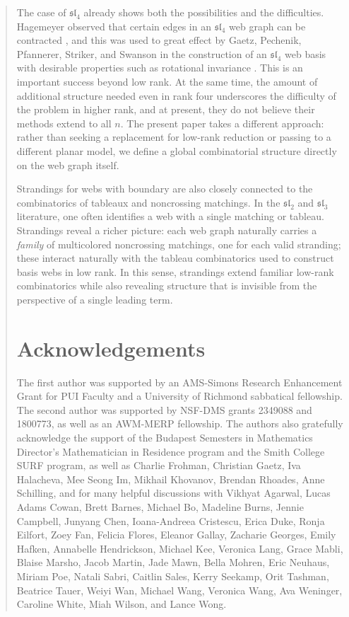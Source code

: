 \documentclass[letterpaper,11pt]{amsart}
\begin{document}
\begin{abstract}
The case of $\mathfrak{sl}_4$ already shows both the possibilities and the difficulties. Hagemeyer observed that certain edges in an $\mathfrak{sl}_4$ web graph can be contracted \cite{Hagemeyer}, and this was used to great effect by Gaetz, Pechenik, Pfannerer, Striker, and Swanson in the construction of an $\mathfrak{sl}_4$ web basis with desirable properties such as rotational invariance \cite{GaetzetalRotation}. This is an important success beyond low rank. At the same time, the amount of additional structure needed even in rank four underscores the difficulty of the problem in higher rank, and at present, they do not believe their methods extend to all $n$. The present paper takes a different approach: rather than seeking a replacement for low-rank reduction or passing to a different planar model, we define a global combinatorial structure directly on the web graph itself.
 
Strandings for webs with boundary are also closely connected to the combinatorics of tableaux and noncrossing matchings. In the $\mathfrak{sl}_2$ and $\mathfrak{sl}_3$ literature, one often identifies a web with a single matching or tableau. Strandings reveal a richer picture: each web graph naturally carries a \emph{family} of multicolored noncrossing matchings, one for each valid stranding; these interact naturally with the tableau combinatorics used to construct basis webs in low rank. In this sense, strandings extend familiar low-rank combinatorics while also revealing structure that is invisible from the perspective of a single leading term.

\section{Acknowledgements}
The first author was supported by an AMS-Simons Research Enhancement Grant for PUI Faculty and a University of Richmond sabbatical fellowship.  The second author was supported by NSF-DMS grants 2349088 and 1800773, as well as an AWM-MERP fellowship. The authors also gratefully acknowledge the support of the Budapest Semesters in Mathematics Director's Mathematician in Residence program and the Smith College SURF program, as well as Charlie Frohman, Christian Gaetz, Iva Halacheva, Mee Seong Im, Mikhail Khovanov, Brendan Rhoades, Anne Schilling, and for many helpful discussions with Vikhyat Agarwal, Lucas Adams Cowan, Brett Barnes, Michael Bo, Madeline Burns, Jennie Campbell, Junyang Chen, Ioana-Andreea Cristescu, Erica Duke,  Ronja Eilfort, Zoey Fan, Felicia Flores, Eleanor Gallay, Zacharie Georges, Emily Hafken, Annabelle Hendrickson, Michael Kee, Veronica Lang, Grace Mabli, Blaise Marsho, Jacob Martin, Jade Mawn, Bella Mohren, Eric Neuhaus, Miriam Poe, Natali Sabri, Caitlin Sales, Kerry Seekamp, Orit Tashman, Beatrice Tauer, Weiyi Wan, Michael Wang, Veronica Wang, Ava Weninger, Caroline White, Miah Wilson, and Lance Wong. 


\end{abstract}
\end{document}
